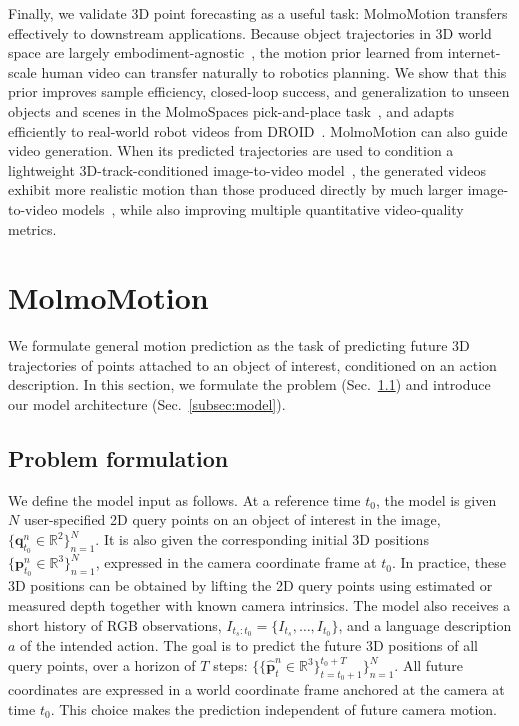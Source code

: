 \documentclass{llmxive}
\providecommand{\modelname}{MolmoMotion\xspace}
\begin{document}
Finally, we validate 3D point forecasting as a useful task: \modelname transfers effectively to downstream applications.
Because object trajectories in 3D world space are largely embodiment-agnostic~\cite{track2act, dharmarajan2025dream2flow}, the motion prior learned from internet-scale human video can transfer naturally to robotics planning. We show that this prior improves sample efficiency, closed-loop success, and generalization to unseen objects and scenes in the MolmoSpaces pick-and-place task~\cite{molmospaces}, and adapts efficiently to real-world robot videos from DROID~\cite{droid}.
\modelname can also guide video generation. When its predicted trajectories are used to condition a lightweight 3D-track-conditioned image-to-video model~\cite{gu2025diffusionasshader}, the generated videos exhibit more realistic motion than those produced directly by much larger image-to-video models~\cite{wan22}, while also improving multiple quantitative video-quality metrics.

\section{\modelname}

We formulate general motion prediction as the task of predicting future 3D trajectories of points attached to an object of interest, conditioned on an action description.
In this section, we formulate the problem (Sec.~\ref{subsec: problem_formulation})
and introduce our model architecture (Sec.~\ref{subsec:model}).

\subsection{Problem formulation}
\label{subsec: problem_formulation}
We define the model input as follows. At a reference time $t_0$, the model is given $N$ user-specified 2D query points on an object of interest in the image,
$\{\mathbf{q}_{t_0}^{n} \in \mathbb{R}^2\}_{n=1}^{N}$.
It is also given the corresponding initial 3D positions
$\{\mathbf{p}_{t_0}^{n} \in \mathbb{R}^3\}_{n=1}^{N}$,
expressed in the camera coordinate frame at $t_0$. In practice, these 3D positions can be obtained by lifting the 2D query points using estimated or measured depth together with known camera intrinsics. 
The model also receives a short history of RGB observations, $I_{t_s:t_0}=\{I_{t_s},\ldots,I_{t_0}\}$, and a language description $a$ of the intended action.
The goal is to predict the future 3D positions of all query points,
over a horizon of $T$ steps: 
$\{\{\hat{\mathbf{p}}_{t}^{n}\in\mathbb{R}^3\}_{t=t_0+1}^{t_0+T}\}_{n=1}^{N}$.
All future coordinates are expressed in a world coordinate frame anchored at the camera at time $t_0$. This choice makes the prediction independent of future camera motion.
\end{document}
